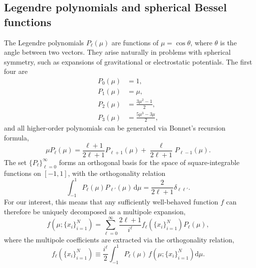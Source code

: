 \documentclass[twocolumn]{aa}
\renewcommand{\d}{\text{d}}
\begin{document}
\begin{appendix}
\section{Legendre polynomials and spherical Bessel functions}
\label{appendix:legendre}
The Legendre polynomials $P_\ell(\mu)$ are functions of $\mu = \cos\theta$, where $\theta$ is the angle between two vectors. They arise naturally in problems with spherical symmetry, such as expansions of gravitational or electrostatic potentials. The first four are
\begin{align*}
      P_0(\mu) &= 1, \\
      P_1(\mu) &= \mu,\\
      P_2(\mu) &= \frac{3\mu^2-1}{2},\\
      P_3(\mu) &= \frac{5\mu^3-3\mu}{2},
\end{align*}
and all higher-order polynomials can be generated via Bonnet's recursion formula,
\begin{equation*}
      \mu P_\ell(\mu) = \frac{\ell+1}{2\ell+1}P_{\ell+1}(\mu) + \frac{\ell}{2\ell+1}P_{\ell-1}(\mu).
\end{equation*}
The set $\{P_\ell\}_{\ell=0}^\infty$ forms an orthogonal basis for the space of square-integrable functions on $[-1,1]$, with the orthogonality relation
\begin{equation*}
      \int_{-1}^1P_\ell(\mu)P_{\ell'}(\mu)\,\d \mu = \frac{2}{2\ell+1}\delta_{\ell\ell'}.
\end{equation*}
For our interest, this means that any sufficiently well-behaved function $f$ can therefore be uniquely decomposed as a multipole expansion,
\begin{equation*}
      f\!\left(\mu;\{x_i\}_{i=1}^N\right) = \sum_{\ell=0}^{\infty}\frac{2\ell + 1}{i^\ell}f_\ell\!\left(\{x_i\}_{i=1}^N\right)P_\ell(\mu),
\end{equation*}
where the multipole coefficients are extracted via the orthogonality relation,
\begin{equation*}
      f_\ell\!\left(\{x_i\}_{i=1}^N\right) \equiv \frac{i^\ell}{2}\int_{-1}^1 P_\ell(\mu)\, f\!\left(\mu;\{x_i\}_{i=1}^N\right)\d \mu.
\end{equation*}


\end{appendix}
\end{document}
